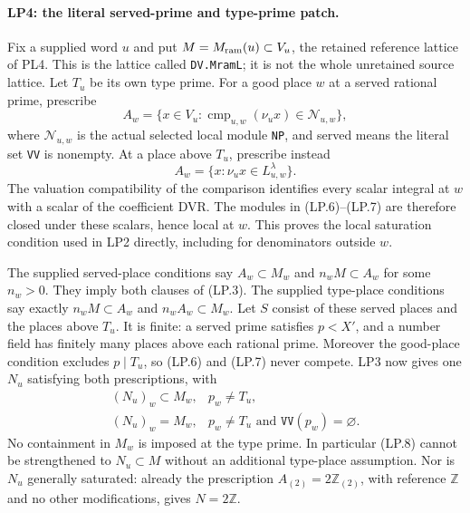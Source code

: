 \paragraph{LP4: the literal served-prime and type-prime patch.}
Fix a supplied word $u$ and put
$M=M_{\rm ram}(u)\subset V_u$, the retained reference lattice of
PL4. This is the lattice called \texttt{DV.MramL}; it is not the
whole unretained source lattice. Let $T_u$ be its own type prime.
For a good place $w$ at a served rational prime, prescribe
\[
 A_w=\{x\in V_u:\operatorname{cmp}_{u,w}(\nu_u x)
                                    \in\mathcal N_{u,w}\},       \tag{LP.6}
\]
where $\mathcal N_{u,w}$ is the actual selected local module
\texttt{NP}, and served means the literal set \texttt{VV} is
nonempty. At a place above $T_u$, prescribe instead
\[
                  A_w=\{x:\nu_u x\in L^\lambda_{u,w}\}.         \tag{LP.7}
\]
The valuation compatibility of the comparison identifies every
scalar integral at $w$ with a scalar of the coefficient DVR.
The modules in (LP.6)--(LP.7) are therefore closed under these
scalars, hence local at $w$. This proves the local saturation
condition used in LP2 directly, including for denominators outside
$w$.

The supplied served-place conditions say
$A_w\subset M_w$ and $n_wM\subset A_w$ for some $n_w>0$.
They imply both clauses of (LP.3). The supplied type-place conditions
say exactly $n_wM\subset A_w$ and $n_wA_w\subset M_w$.
Let $S$ consist of these served places and the places above $T_u$.
It is finite: a served prime satisfies $p<X'$, and a number field
has finitely many places above each rational prime. Moreover the
good-place condition excludes $p\mid T_u$, so (LP.6) and (LP.7)
never compete. LP3 now gives one $N_u$ satisfying both prescriptions,
with
\[
 \begin{array}{ll}
 (N_u)_w\subset M_w,&p_w\ne T_u,\\
 (N_u)_w=M_w,&p_w\ne T_u\text{ and }\texttt{VV}(p_w)=\varnothing.
 \end{array}                                                   \tag{LP.8}
\]
No containment in $M_w$ is imposed at the type prime. In particular
(LP.8) cannot be strengthened to $N_u\subset M$ without an
additional type-place assumption. Nor is $N_u$ generally saturated:
already the prescription $A_{(2)}=2\mathbb Z_{(2)}$, with reference
$\mathbb Z$ and no other modifications, gives $N=2\mathbb Z$.

